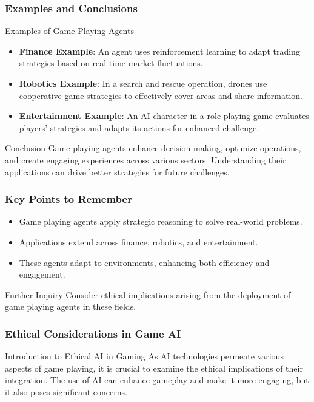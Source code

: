 \documentclass[aspectratio=169]{beamer}
\begin{document}
\begin{frame}[fragile]
  \frametitle{Examples and Conclusions}
  \begin{block}{Examples of Game Playing Agents}
    \begin{itemize}
      \item \textbf{Finance Example}: An agent uses reinforcement learning to adapt trading strategies based on real-time market fluctuations.
      \item \textbf{Robotics Example}: In a search and rescue operation, drones use cooperative game strategies to effectively cover areas and share information.
      \item \textbf{Entertainment Example}: An AI character in a role-playing game evaluates players' strategies and adapts its actions for enhanced challenge.
    \end{itemize}
  \end{block}

  \begin{block}{Conclusion}
    Game playing agents enhance decision-making, optimize operations, and create engaging experiences across various sectors. Understanding their applications can drive better strategies for future challenges.
  \end{block}
\end{frame}

\begin{frame}[fragile]
  \frametitle{Key Points to Remember}
  \begin{itemize}
    \item Game playing agents apply strategic reasoning to solve real-world problems.
    \item Applications extend across finance, robotics, and entertainment.
    \item These agents adapt to environments, enhancing both efficiency and engagement.
  \end{itemize}
  \begin{block}{Further Inquiry}
    Consider ethical implications arising from the deployment of game playing agents in these fields.
  \end{block}
\end{frame}

\begin{frame}[fragile]
  \frametitle{Ethical Considerations in Game AI}
  \begin{block}{Introduction to Ethical AI in Gaming}
    As AI technologies permeate various aspects of game playing, it is crucial to examine the ethical implications of their integration. The use of AI can enhance gameplay and make it more engaging, but it also poses significant concerns.
  \end{block}
\end{frame}
\end{document}
